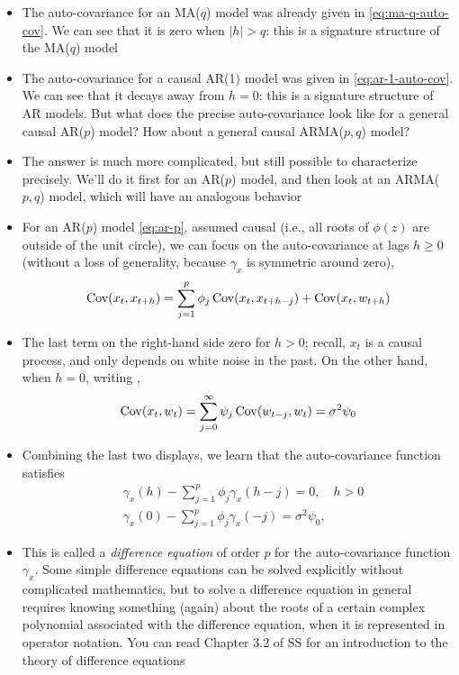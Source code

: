 \documentclass{article}
\begin{document}
\begin{itemize}
\item The auto-covariance for an MA($q$) model was already given in
  \eqref{eq:ma-q-auto-cov}. We can see that it is zero when $|h| > q$: this is a
  signature structure of the MA($q$) model 

\item The auto-covariance for a causal AR(1) model was given in
  \eqref{eq:ar-1-auto-cov}. We can see that it decays away from $h=0$: this is 
  a signature structure of AR models. But what does the precise auto-covariance
  look like for a general causal AR($p$) model? How about a general causal
  ARMA($p,q$) model?  

\item The answer is much more complicated, but still possible to characterize
  precisely. We'll do it first for an AR($p$) model, and then look at an
  ARMA($p,q$) model, which will have an analogous behavior 

\item For an AR($p$) model \eqref{eq:ar-p}, assumed causal (i.e., all roots of
  $\phi(z)$ are outside of the unit circle), we can focus on the auto-covariance  
  at lags $ h \geq 0$ (without a loss of generality, because $\gamma_x$ is
  symmetric around zero), 
  \[
  \operatorname{Cov}(x_t, x_{t+h}) = \sum_{j=1}^p \phi_j \operatorname{Cov}(x_t, x_{t+h-j}) + \operatorname{Cov}(x_t,
  w_{t+h})  
  \]

\item The last term on the right-hand side zero for $h>0$; recall, $x_t$ is a  
  causal process, and only depends on white noise in the past. On the other
  hand, when $h=0$, writing , 
  \[
  \operatorname{Cov}(x_t, w_t) = \sum_{j=0}^\infty \psi_j \operatorname{Cov}(w_{t-j}, w_t) =  \sigma^2
  \psi_0   
  \]

\item Combining the last two displays, we learn that the auto-covariance
  function satisfies 
  \begin{align*}
  &\gamma_x(h) - \sum_{j=1}^p \phi_j \gamma_x(h-j) = 0, \quad h > 0 \\ 
  &\gamma_x(0) - \sum_{j=1}^p \phi_j \gamma_x(-j) = \sigma^2 \psi_0, 
  \end{align*}

\item This is called a \emph{difference equation} of order $p$ for the
  auto-covariance function $\gamma_x$. Some simple difference equations can be
  solved explicitly without complicated mathematics, but to solve a difference  
  equation in general requires knowing something (again) about the roots of a
  certain complex polynomial associated with the difference equation, when it is
  represented in operator notation. You can read Chapter 3.2 of SS for an
  introduction to the theory of difference equations


\end{itemize}
\end{document}
